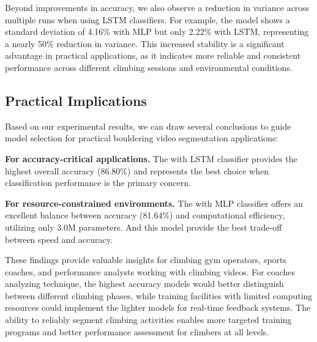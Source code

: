 Beyond improvements in accuracy, we also observe a reduction in variance across multiple runs when using LSTM classifiers. For example, the  model shows a standard deviation of 4.16\% with MLP but only 2.22\% with LSTM, representing a nearly 50\% reduction in variance. This increased stability is a significant advantage in practical applications, as it indicates more reliable and consistent performance across different climbing sessions and environmental conditions.

\subsection{Practical Implications}
Based on our experimental results, we can draw several conclusions to guide model selection for practical bouldering video segmentation applications:

\noindent\textbf{For accuracy-critical applications.}
The  with LSTM classifier provides the highest overall accuracy (86.80\%) and represents the best choice when classification performance is the primary concern.
    
\noindent\textbf{For resource-constrained environments.}
The  with MLP classifier offers an excellent balance between accuracy (81.64\%) and computational efficiency, utilizing only 3.0M parameters. And this model provide the best trade-off between speed and accuracy.
    
These findings provide valuable insights for climbing gym operators, sports coaches, and performance analysts working with climbing videos. For coaches analyzing technique, the highest accuracy models would better distinguish between different climbing phases, while training facilities with limited computing resources could implement the lighter models for real-time feedback systems. The ability to reliably segment climbing activities enables more targeted training programs and better performance assessment for climbers at all levels.